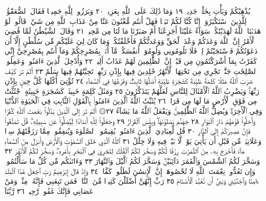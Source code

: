 يُذْهِبْكُمْ وَيَأْتِ بِخَلْقࣲ جَدِيدࣲ ١٩ وَمَا ذَٰلِكَ عَلَى ٱللَّهِ بِعَزِيزࣲ ٢٠
وَبَرَزُوا۟ لِلَّهِ جَمِيعࣰا فَقَالَ ٱلضُّعَفَٰٓؤُا۟ لِلَّذِينَ ٱسْتَكْبَرُوٓا۟
إِنَّا كُنَّا لَكُمْ تَبَعࣰا فَهَلْ أَنتُم مُّغْنُونَ عَنَّا مِنْ عَذَابِ ٱللَّهِ
مِن شَيْءࣲۚ قَالُوا۟ لَوْ هَدَىٰنَا ٱللَّهُ لَهَدَيْنَٰكُمْۖ سَوَآءٌ عَلَيْنَآ
أَجَزِعْنَآ أَمْ صَبَرْنَا مَا لَنَا مِن مَّحِيصࣲ ٢١ وَقَالَ ٱلشَّيْطَٰنُ لَمَّا
قُضِيَ ٱلْأَمْرُ إِنَّ ٱللَّهَ وَعَدَكُمْ وَعْدَ ٱلْحَقِّ وَوَعَدتُّكُمْ
فَأَخْلَفْتُكُمْۖ وَمَا كَانَ لِيَ عَلَيْكُم مِّن سُلْطَٰنٍ إِلَّآ
أَن دَعَوْتُكُمْ فَٱسْتَجَبْتُمْ لِيۖ فَلَا تَلُومُونِي وَلُومُوٓا۟ أَنفُسَكُمۖ
مَّآ أَنَا۠ بِمُصْرِخِكُمْ وَمَآ أَنتُم بِمُصْرِخِيَّ إِنِّي كَفَرْتُ
بِمَآ أَشْرَكْتُمُونِ مِن قَبْلُۗ إِنَّ ٱلظَّٰلِمِينَ لَهُمْ عَذَابٌ
أَلِيمࣱ ٢٢ وَأُدْخِلَ ٱلَّذِينَ ءَامَنُوا۟ وَعَمِلُوا۟ ٱلصَّٰلِحَٰتِ جَنَّٰتࣲ
تَجْرِي مِن تَحْتِهَا ٱلْأَنْهَٰرُ خَٰلِدِينَ فِيهَا بِإِذْنِ رَبِّهِمْۖ تَحِيَّتُهُمْ
فِيهَا سَلَٰمٌ ٢٣ أَلَمْ تَرَ كَيْفَ ضَرَبَ ٱللَّهُ مَثَلࣰا كَلِمَةࣰ طَيِّبَةࣰ
كَشَجَرَةࣲ طَيِّبَةٍ أَصْلُهَا ثَابِتࣱ وَفَرْعُهَا فِي ٱلسَّمَآءِ ٢٤
تُؤْتِيٓ أُكُلَهَا كُلَّ حِينِۭ بِإِذْنِ رَبِّهَاۗ وَيَضْرِبُ ٱللَّهُ ٱلْأَمْثَالَ
لِلنَّاسِ لَعَلَّهُمْ يَتَذَكَّرُونَ ٢٥ وَمَثَلُ كَلِمَةٍ خَبِيثَةࣲ
كَشَجَرَةٍ خَبِيثَةٍ ٱجْتُثَّتْ مِن فَوْقِ ٱلْأَرْضِ مَا لَهَا مِن
قَرَارࣲ ٢٦ يُثَبِّتُ ٱللَّهُ ٱلَّذِينَ ءَامَنُوا۟ بِٱلْقَوْلِ ٱلثَّابِتِ فِي ٱلْحَيَوٰةِ
ٱلدُّنْيَا وَفِي ٱلْأٓخِرَةِۖ وَيُضِلُّ ٱللَّهُ ٱلظَّٰلِمِينَۚ وَيَفْعَلُ ٱللَّهُ
مَا يَشَآءُ ٢٧۞ أَلَمْ تَرَ إِلَى ٱلَّذِينَ بَدَّلُوا۟ نِعْمَتَ ٱللَّهِ كُفْرࣰا
وَأَحَلُّوا۟ قَوْمَهُمْ دَارَ ٱلْبَوَارِ ٢٨ جَهَنَّمَ يَصْلَوْنَهَاۖ وَبِئْسَ
ٱلْقَرَارُ ٢٩ وَجَعَلُوا۟ لِلَّهِ أَندَادࣰا لِّيُضِلُّوا۟ عَن سَبِيلِهِۦۗ قُلْ
تَمَتَّعُوا۟ فَإِنَّ مَصِيرَكُمْ إِلَى ٱلنَّارِ ٣٠ قُل لِّعِبَادِيَ ٱلَّذِينَ
ءَامَنُوا۟ يُقِيمُوا۟ ٱلصَّلَوٰةَ وَيُنفِقُوا۟ مِمَّا رَزَقْنَٰهُمْ سِرࣰّا وَعَلَانِيَةࣰ
مِّن قَبْلِ أَن يَأْتِيَ يَوْمࣱ لَّا بَيْعࣱ فِيهِ وَلَا خِلَٰلٌ ٣١ ٱللَّهُ ٱلَّذِي
خَلَقَ ٱلسَّمَٰوَٰتِ وَٱلْأَرْضَ وَأَنزَلَ مِنَ ٱلسَّمَآءِ مَآءࣰ فَأَخْرَجَ
بِهِۦ مِنَ ٱلثَّمَرَٰتِ رِزْقࣰا لَّكُمْۖ وَسَخَّرَ لَكُمُ ٱلْفُلْكَ لِتَجْرِيَ
فِي ٱلْبَحْرِ بِأَمْرِهِۦۖ وَسَخَّرَ لَكُمُ ٱلْأَنْهَٰرَ ٣٢ وَسَخَّرَ لَكُمُ
ٱلشَّمْسَ وَٱلْقَمَرَ دَآئِبَيْنِۖ وَسَخَّرَ لَكُمُ ٱلَّيْلَ وَٱلنَّهَارَ ٣٣
وَءَاتَىٰكُم مِّن كُلِّ مَا سَأَلْتُمُوهُۚ وَإِن تَعُدُّوا۟ نِعْمَتَ ٱللَّهِ
لَا تُحْصُوهَآۗ إِنَّ ٱلْإِنسَٰنَ لَظَلُومࣱ كَفَّارࣱ ٣٤ وَإِذْ قَالَ إِبْرَٰهِيمُ
رَبِّ ٱجْعَلْ هَٰذَا ٱلْبَلَدَ ءَامِنࣰا وَٱجْنُبْنِي وَبَنِيَّ أَن نَّعْبُدَ
ٱلْأَصْنَامَ ٣٥ رَبِّ إِنَّهُنَّ أَضْلَلْنَ كَثِيرࣰا مِّنَ ٱلنَّاسِۖ فَمَن
تَبِعَنِي فَإِنَّهُۥ مِنِّيۖ وَمَنْ عَصَانِي فَإِنَّكَ غَفُورࣱ رَّحِيمࣱ ٣٦ رَّبَّنَآ
